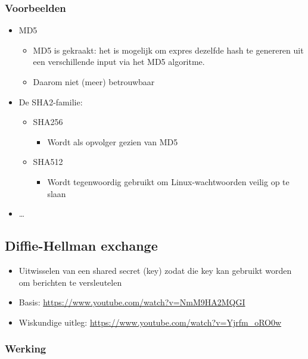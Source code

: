 \documentclass{article}
\begin{document}
\subsubsection{Voorbeelden}

\begin{itemize}
    \item MD5
    \begin{itemize}
        \item MD5 is gekraakt: het is mogelijk om expres dezelfde hash te genereren uit een verschillende input via het MD5 algoritme.
        \item Daarom niet (meer) betrouwbaar
    \end{itemize}
    \item De SHA2-familie:
    \begin{itemize}
        \item SHA256
        \begin{itemize}
            \item Wordt als opvolger gezien van MD5
        \end{itemize}
        \item SHA512
        \begin{itemize}
            \item Wordt tegenwoordig gebruikt om Linux-wachtwoorden veilig op te slaan
        \end{itemize}
    \end{itemize}
    \item \dots
\end{itemize}

\subsection{Diffie-Hellman exchange}

\begin{itemize}
    \item Uitwisselen van een shared secret (key) zodat die key kan gebruikt worden om berichten te versleutelen
    \item Basis: \url{https://www.youtube.com/watch?v=NmM9HA2MQGI}
    \item Wiskundige uitleg: \url{https://www.youtube.com/watch?v=Yjrfm_oRO0w}
\end{itemize}

\subsubsection{Werking}
\end{document}
